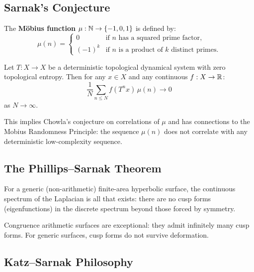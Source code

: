 \subsection{Sarnak's Conjecture}

\begin{definition}
The \textbf{M\"obius function} $\mu: \mathbb{N} \to \{-1, 0, 1\}$ is defined by:
\[
\mu(n) = \begin{cases}
0 & \text{if } n \text{ has a squared prime factor}, \\
(-1)^k & \text{if } n \text{ is a product of } k \text{ distinct primes}.
\end{cases}
\]
\end{definition}

\begin{conjecture}
Let $T: X \to X$ be a deterministic topological dynamical system with zero topological entropy. Then for any $x \in X$ and any continuous $f: X \to \mathbb{R}$:
\[
\frac{1}{N} \sum_{n \leq N} f(T^n x) \,\mu(n) \to 0
\]
as $N \to \infty$.
\end{conjecture}

This implies Chowla's conjecture on correlations of $\mu$ and has connections to the Mobius Randomness Principle: the sequence $\mu(n)$ does not correlate with any deterministic low-complexity sequence.

\subsection{The Phillips--Sarnak Theorem}

\begin{theorem}
For a generic (non-arithmetic) finite-area hyperbolic surface, the continuous spectrum of the Laplacian is all that exists: there are no cusp forms (eigenfunctions) in the discrete spectrum beyond those forced by symmetry.
\end{theorem}

\begin{corollary}
Congruence arithmetic surfaces are exceptional: they admit infinitely many cusp forms. For generic surfaces, cusp forms do not survive deformation.
\end{corollary}

\subsection{Katz--Sarnak Philosophy}

